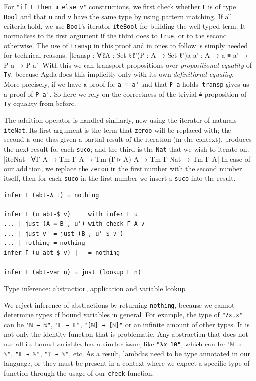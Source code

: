 For \verb$"if t then u else v"$ constructions, we first check whether \verb$t$ is of type \verb$Bool$ and that \verb$u$ and \verb$v$ have the same type by using pattern matching. If all criteria hold, we use \verb$Bool$'s iterator \verb$iteBool$ for building the well-typed term. It normalises to its first argument if the third does to \verb$true$, or to the second otherwise. The use of \verb$transp$ in this proof and in ones to follow is simply needed for technical reasons.
|transp : ∀{ℓ}{A : Set ℓ}{ℓ'}(P : A → Set ℓ'){a a' : A} → a ≡ a' → P a → P a'|
With this we can transport propositions over \textit{propositional equality} of \verb$Ty$, because Agda does this implicitly only with its own \textit{definitional equality}. More precisely, if we have a proof for \verb$a ≡ a'$ and that \verb$P a$ holds, \verb$transp$ gives us a proof of \verb$P a'$. So here we rely on the correctness of the trivial \verb$≟$ proposition of \verb$Ty$ equality from before.

The addition operator is handled similarly, now using the iterator of naturals \verb$iteNat$. Its first argument is the term that \verb$zeroo$ will be replaced with; the second is one that given a partial result of the iteration (in the context), produces the next result for each \verb$suco$; and the third is the \verb$Nat$ that we wish to iterate on.
|iteNat : ∀{Γ A} → Tm Γ A → Tm (Γ ▹ A) A → Tm Γ Nat → Tm Γ A|
In case of our addition, we replace the \verb$zeroo$ in the first number with the second number itself, then for each \verb$suco$ in the first number we insert a \verb$suco$ into the result.

\begin{listing}[H]
\begin{verbatim}
infer Γ (abt-λ t) = nothing

infer Γ (u abt-$ v)     with infer Γ u
... | just (A ⇒ B , u') with check Γ A v
... | just v' = just (B , u' $ v')
... | nothing = nothing
infer Γ (u abt-$ v) | _ = nothing

infer Γ (abt-var n) = just (lookup Γ n)
\end{verbatim}
\caption{Type inference: abstraction, application and variable lookup}
\label{code:typecheck-infer-lam}
\end{listing}

We reject inference of abstractions by returning \verb$nothing$, because we cannot determine types of bound variables in general. For example, the type of \verb$"λx.x"$ can be \verb$"ℕ → ℕ"$, \verb$"𝕃 → 𝕃"$, \verb$"[ℕ] → [ℕ]"$ or an infinite amount of other types. It is not only the identity function that is problematic. Any abstraction that does not use all its bound variables has a similar issue, like \verb$"λx.10"$, which can be \verb$"ℕ → ℕ"$, \verb$"𝕃 → ℕ"$, \verb$"⊤ → ℕ"$, etc. As a result, lambdas need to be type annotated in our language, or they must be present in a context where we expect a specific type of function through the usage of our \verb$check$ function.

